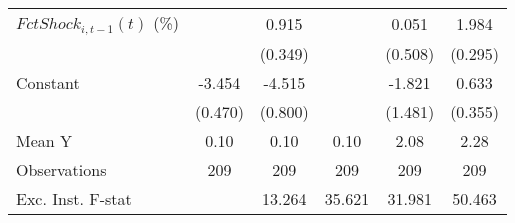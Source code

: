 {\begin{tabular}{l*{5}{c}}
\addlinespace
$ FctShock_{i,t-1}(t)$ (\%)&                     &       0.915\sym{**} &                     &       0.051         &       1.984\sym{***}\\
                    &                     &     (0.349)         &                     &     (0.508)         &     (0.295)         \\
\addlinespace
Constant            &      -3.454\sym{***}&      -4.515\sym{***}&                     &      -1.821         &       0.633         \\
                    &     (0.470)         &     (0.800)         &                     &     (1.481)         &     (0.355)         \\
\midrule
Mean Y              &        0.10         &        0.10         &        0.10         &        2.08         &        2.28         \\
Observations        &         209         &         209         &         209         &         209         &         209         \\
Exc. Inst. F-stat   &                     &      13.264         &      35.621         &      31.981         &      50.463         \\
\bottomrule
\end{tabular}
}
